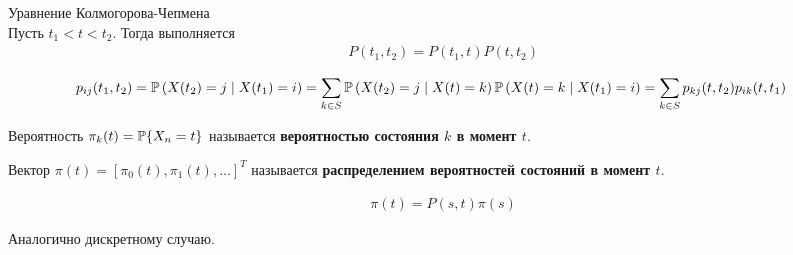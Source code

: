 \begin{theorem} Уравнение Колмогорова-Чепмена
    \\
    Пусть $t_1 < t < t_2$. Тогда выполняется
    \begin{align*}
      & P(t_1,t_2) = P(t_1,t)P(t,t_2)
    \end{align*}
\end{theorem}
\begin{Proof}
    \begin{align*}
      & p_{ij}(t_1,t_2) = \mathbb{P}\left( X(t_2) = j \mid X(t_1) = i \right) = \sum_{k \in S}\mathbb{P}\left( X(t_2) = j \mid X(t)=k \right)\mathbb{P}\left( X(t) = k \mid X(t_1) = i \right) = \sum_{k \in S}p_{kj}(t,t_2)p_{ik}(t,t_1)
    \end{align*}
\end{Proof}
\begin{Def}
    Вероятность $\pi_k(t) = \mathbb{P}\{X_n = t\}$ называется \textbf{вероятностью
      состояния $k$ в момент $t$}.
\end{Def}
\begin{Def}
    Вектор $\pi(t) = \left[ \pi_0(t), \pi_1(t), \dots \right]^T$ называется
    \textbf{распределением вероятностей состояний в момент $t$}.
\end{Def}
\begin{theorem}
    \begin{align*}
      & \pi(t) = P(s,t)\pi(s)
    \end{align*}
\end{theorem}
\begin{Proof}
    Аналогично дискретному случаю.
\end{Proof}
